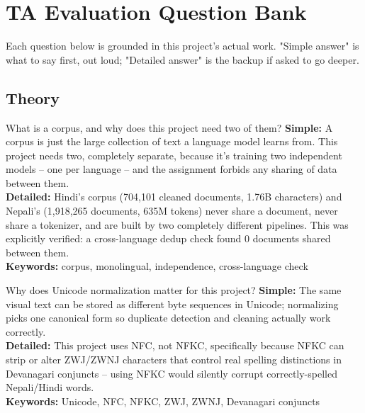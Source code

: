 \documentclass[11pt]{report}
\begin{document}
\chapter{TA Evaluation Question Bank}

Each question below is grounded in this project's actual work. "Simple
answer" is what to say first, out loud; "Detailed answer" is the backup
if asked to go deeper.

\section{Theory}

\begin{qabox}{What is a corpus, and why does this project need two of
them?}
\textbf{Simple:} A corpus is just the large collection of text a
language model learns from. This project needs two, completely separate,
because it's training two independent models -- one per language -- and
the assignment forbids any sharing of data between them.\\
\textbf{Detailed:} Hindi's corpus (704,101 cleaned documents,
1.76B characters) and Nepali's (1,918,265 documents, 635M tokens) never
share a document, never share a tokenizer, and are built by two
completely different pipelines. This was explicitly verified: a
cross-language dedup check found 0 documents shared between them.\\
\textbf{Keywords:} corpus, monolingual, independence, cross-language check
\end{qabox}

\begin{qabox}{Why does Unicode normalization matter for this project?}
\textbf{Simple:} The same visual text can be stored as different byte
sequences in Unicode; normalizing picks one canonical form so duplicate
detection and cleaning actually work correctly.\\
\textbf{Detailed:} This project uses NFC, not NFKC, specifically because
NFKC can strip or alter ZWJ/ZWNJ characters that control real spelling
distinctions in Devanagari conjuncts -- using NFKC would silently corrupt
correctly-spelled Nepali/Hindi words.\\
\textbf{Keywords:} Unicode, NFC, NFKC, ZWJ, ZWNJ, Devanagari conjuncts
\end{qabox}
\end{document}
